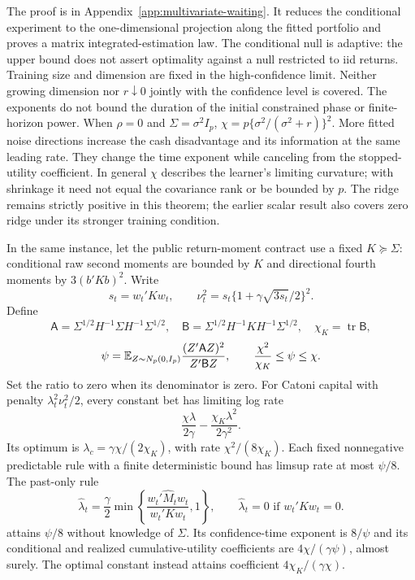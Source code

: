 The proof is in Appendix~\ref{app:multivariate-waiting}. It reduces the
conditional experiment to the one-dimensional projection along the fitted
portfolio and proves a matrix integrated-estimation law. The conditional null
is adaptive: the upper bound does not assert optimality against a null
restricted to iid returns. Training size and dimension are fixed in the
high-confidence limit. Neither growing dimension nor $r\downarrow0$ jointly
with the confidence level is covered.
The exponents do not bound the duration of the initial constrained phase or
finite-horizon power.
When $\rho=0$ and $\Sigma=\sigma^2 I_p$,
$\chi=p\{\sigma^2/(\sigma^2+r)\}^2$. More fitted noise directions increase
the cash disadvantage and its information at the same leading rate. They
change the time exponent while canceling from the stopped-utility coefficient.
In general $\chi$ describes the learner's limiting curvature; with shrinkage
it need not equal the covariance rank or be bounded by $p$.
The ridge remains strictly positive in this theorem; the earlier scalar result
also covers zero ridge under its stronger training condition.

\begin{corollary}
\label{cor:multivariate-geometric-bet}
In the same instance, let the public return-moment contract use a fixed
$K\succeq\Sigma$: conditional raw second moments are bounded by $K$ and
directional fourth moments by $3(b'Kb)^2$. Write
\[
 s_t=w_t'Kw_t,\qquad
 \nu_t^2=s_t\{1+\gamma\sqrt{3s_t}/2\}^2.
\]
Define
\[
 \mathsf A=\Sigma^{1/2}H^{-1}\Sigma H^{-1}\Sigma^{1/2},\quad
 \mathsf B=\Sigma^{1/2}H^{-1}KH^{-1}\Sigma^{1/2},\quad
 \chi_K=\operatorname{tr}\mathsf B,
\]
\[
 \psi=\mathbb E_{Z\sim N_p(0,I_p)}
       \frac{(Z'\mathsf A Z)^2}{Z'\mathsf B Z},
 \qquad \frac{\chi^2}{\chi_K}\le\psi\le\chi.
\]
Set the ratio to zero when its denominator is zero. For Catoni capital with
penalty $\lambda_t^2\nu_t^2/2$, every constant bet has limiting log rate
\[
 \frac{\chi\lambda}{2\gamma}
       -\frac{\chi_K\lambda^2}{2\gamma^2}.
\]
Its optimum is $\lambda_c=\gamma\chi/(2\chi_K)$, with rate
$\chi^2/(8\chi_K)$.
Each fixed nonnegative predictable rule with a finite deterministic bound
has limsup rate at most $\psi/8$. The past-only rule
\[
 \widehat\lambda_t=\frac\gamma2
       \min\!\left\{\frac{w_t'\widehat M_tw_t}{w_t'Kw_t},1\right\},
 \qquad \widehat\lambda_t=0\text{ if }w_t'Kw_t=0.
\]
attains $\psi/8$ without knowledge of $\Sigma$. Its confidence-time exponent
is $8/\psi$ and its conditional and realized cumulative-utility coefficients
are $4\chi/(\gamma\psi)$, almost surely. The optimal constant instead attains
coefficient $4\chi_K/(\gamma\chi)$.
\end{corollary}

